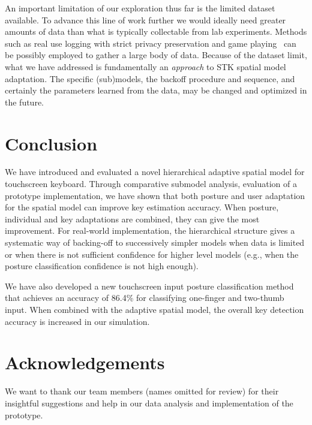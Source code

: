 \documentclass{sigchi}
\begin{document}
An important limitation of our exploration thus far is the limited dataset available. To advance this line of work further we would ideally need greater amounts of data than what is typically collectable from lab experiments. Methods such as real use logging with strict privacy preservation and game playing~\cite{Rudchenko:2011} can be possibly employed to gather a large body of data. Because of the dataset limit, what we have addressed is fundamentally an \textit{approach} to STK spatial model adaptation. The specific (sub)models, the backoff procedure and sequence, and certainly the parameters learned from the data, may be changed and optimized in the future. 

\section{Conclusion}
We have introduced and evaluated a novel hierarchical adaptive spatial model for
touchscreen keyboard. Through comparative submodel analysis,  evaluation of a prototype implementation, we have shown that both posture and user adaptation for the spatial model can improve key estimation accuracy. When posture, individual and key adaptations are combined, they can
give the most improvement. For real-world
implementation, the
hierarchical structure gives a systematic way of backing-off to successively simpler models  when data is limited
or when there is not sufficient confidence for higher level models (e.g., when the posture classification confidence is not 
high enough).

We have also developed a new touchscreen input posture classification method
that achieves an accuracy of 86.4\% for classifying one-finger and two-thumb input. When
combined with the adaptive spatial model, the overall key detection accuracy is increased
in our simulation.

\section{Acknowledgements}
We want to thank our team members (names omitted for review) for their insightful
suggestions and help in  our data analysis and implementation of the prototype.
\balance
\small


\end{document}

